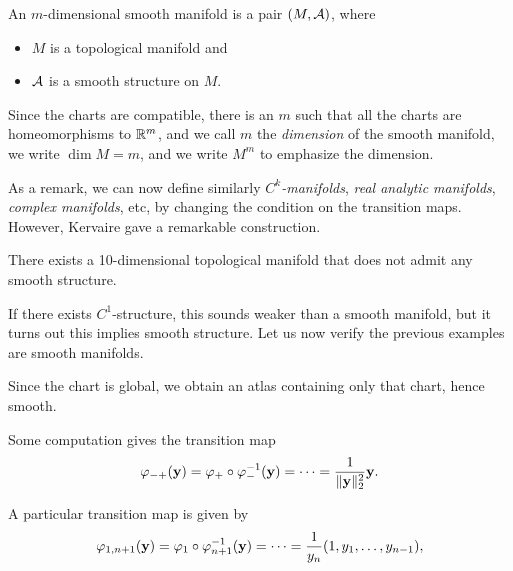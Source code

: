 \begin{definition}
  An \(m\)-dimensional smooth manifold is a pair \((M,\mathcal{A})\), where \begin{itemize}
    \item \(M\) is a topological manifold and
    \item \(\mathcal{A}\) is a smooth structure on \(M\).
  \end{itemize}
  Since the charts are compatible, there is an \(m\) such that all the charts are homeomorphisms to \(\mathbb{R}^m\), and we call \(m\) the \emph{dimension} of the smooth manifold, we write \(\dim M = m\), and we write \(M^m\) to emphasize the dimension. 
\end{definition}

As a remark, we can now define similarly \emph{\(C^k\)-manifolds}, \emph{real analytic manifolds}, \emph{complex manifolds}, etc, by changing the condition on the transition maps. However, Kervaire gave a remarkable construction.

\begin{proposition}[Kervaire]
  There exists a 10-dimensional topological manifold that does not admit any smooth structure.
\end{proposition}

If there exists \(C^1\)-structure, this sounds weaker than a smooth manifold, but it turns out this implies smooth structure. Let us now verify the previous examples are smooth manifolds.
\begin{example}
  Since the chart is global, we obtain an atlas containing only that chart, hence smooth.
\end{example}

\begin{example}[spheres \(S^n\)]
  Some computation gives the transition map \begin{align*}
    \varphi_{-+}(\mathbf{y})
    = \varphi_+\circ\varphi_-^{-1}(\mathbf{y})
    = \cdots
    = \frac{1}{\|\mathbf{y}\|_2^2}\mathbf{y}.
  \end{align*}
\end{example}

\begin{example}
  A particular transition map is given by \begin{align*}
    \varphi_{1,n+1}(\mathbf{y})
    = \varphi_1\circ\varphi_{n+1}^{-1}(\mathbf{y})
    = \cdots
    = \frac{1}{y_n}(1,y_1,\ldots,y_{n-1}),
  \end{align*}
\end{example}

